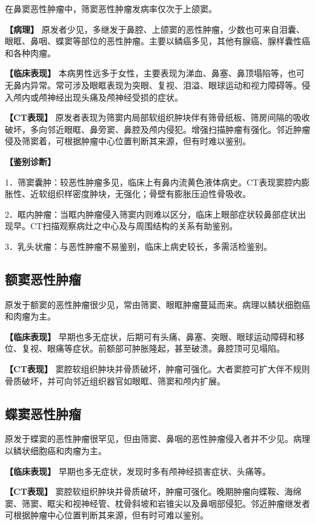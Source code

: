 在鼻窦恶性肿瘤中，筛窦恶性肿瘤发病率仅次于上颌窦。

\textbf{【病理】}
原发者少见，多继发于鼻腔、上颌窦的恶性肿瘤，少数也可来自泪囊、眼眶、鼻咽、蝶窦等部位的恶性肿瘤。主要以鳞癌多见，其他有腺癌、腺样囊性癌和各种肉瘤。

\textbf{【临床表现】}
本病男性远多于女性，主要表现为涕血、鼻塞、鼻顶塌陷等，也可无鼻内异常。常可涉及眼眶表现为突眼、复视、泪溢、眼球运动和视力障碍等。侵入颅内或颅神经出现头痛及颅神经受损的症状。

\textbf{【CT表现】}
原发者表现为筛窦内局部软组织肿块伴有筛骨纸板、筛房间隔的吸收破坏，多向邻近眼眶、鼻旁窦、鼻腔及颅内侵犯。增强扫描肿瘤有强化。邻近肿瘤侵及筛窦着，可根据肿瘤中心位置判断其来源，但有时难以鉴别。

\textbf{【鉴别诊断】}

1．筛窦囊肿：较恶性肿瘤多见，临床上有鼻内流黄色液体病史。CT表现窦腔内膨胀性、近软组织样密度肿块，无强化；骨壁有膨胀压迫性骨吸收。

2．眶内肿瘤：当眶内肿瘤侵入筛窦内则难以区分，临床上眼部症状较鼻部症状出现早。CT扫描观察病灶之中心及与周围结构的关系有助鉴别。

3．乳头状瘤：与恶性肿瘤不易鉴别，临床上病史较长，多需活检鉴别。

\subsection{额窦恶性肿瘤}

原发于额窦的恶性肿瘤很少见，常由筛窦、眼眶肿瘤蔓延而来。病理以鳞状细胞癌和肉瘤为主。

\textbf{【临床表现】}
早期也多无症状，后期可有头痛、鼻塞、突眼、眼球运动障碍和移位、复视、眼痛等症状。前额部可肿胀隆起，甚至破溃。鼻腔顶可见塌陷。

\textbf{【CT表现】}
窦腔软组织肿块并骨质破坏，肿瘤可强化。大者窦腔可扩大伴不规则骨质破坏，并可向邻近组织器官如眼眶、筛窦和颅内扩展。

\subsection{蝶窦恶性肿瘤}

原发于蝶窦的恶性肿瘤很罕见，但由筛窦、鼻咽的恶性肿瘤侵入者并不少见。病理以鳞状细胞癌和肉瘤为主。

\textbf{【临床表现】} 早期也多无症状，发现时多有颅神经损害症状、头痛等。

\textbf{【CT表现】}
窦腔软组织肿块并骨质破坏，肿瘤可强化。晚期肿瘤向蝶鞍、海绵窦、筛窦、眶尖和视神经管、枕骨斜坡和岩锥尖以及鼻咽部侵犯。邻近肿瘤继发者可根据肿瘤中心位置判断其来源，但有时可难以鉴别。

